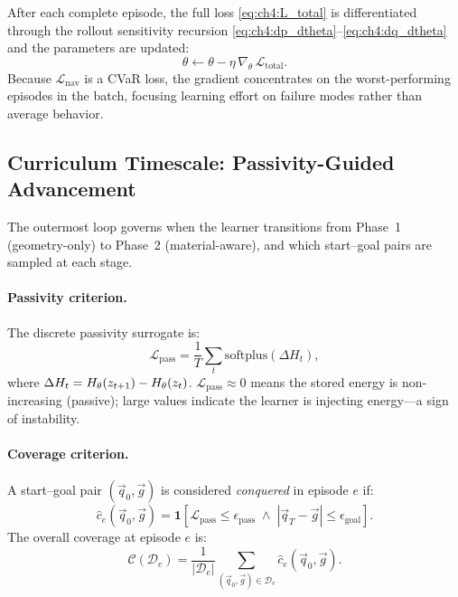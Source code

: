 After each complete episode, the full loss \eqref{eq:ch4:L_total} is
differentiated through the rollout sensitivity recursion
\eqref{eq:ch4:dp_dtheta}--\eqref{eq:ch4:dq_dtheta} and the parameters
are updated:
\begin{equation}
  \theta \leftarrow \theta - \eta\,\nabla_\theta\,\mathcal{L}_{\mathrm{total}}.
  \label{eq:ch4:episode_update}
\end{equation}
Because $\mathcal{L}_{\mathrm{nav}}$ is a CVaR loss, the gradient
concentrates on the worst-performing episodes in the batch, focusing
learning effort on failure modes rather than average behavior.

\subsection{Curriculum Timescale: Passivity-Guided Advancement}
\label{subsec:ch4:curriculum}

The outermost loop governs when the learner transitions from
Phase~1 (geometry-only) to Phase~2 (material-aware), and which
start–goal pairs are sampled at each stage.

\paragraph{Passivity criterion.}
The discrete passivity surrogate is:
\begin{equation}
  \mathcal{L}_{\mathrm{pass}}
  = \frac{1}{T}\sum_t \mathrm{softplus}(\Delta H_t),
  \label{eq:ch4:L_pass}
\end{equation}
where $\Delta H_t = H_\theta(z_{t+1}) - H_\theta(z_t)$.
$\mathcal{L}_{\mathrm{pass}} \approx 0$ means the stored energy is
non-increasing (passive); large values indicate the learner is
injecting energy—a sign of instability.

\paragraph{Coverage criterion.}
A start–goal pair $(\vec{q}_0, \vec{g})$ is considered
\emph{conquered} in episode $e$ if:
\begin{equation}
  \hat{c}_e(\vec{q}_0,\vec{g})
  = \mathbf{1}\!\left[
      \mathcal{L}_{\mathrm{pass}} \leq \epsilon_{\mathrm{pass}}
      \;\wedge\;
      |\vec{q}_T - \vec{g}| \leq \epsilon_{\mathrm{goal}}
    \right].
  \label{eq:ch4:conquest}
\end{equation}
The overall coverage at episode $e$ is:
\begin{equation}
  \mathcal{C}(\mathcal{D}_e)
  = \frac{1}{|\mathcal{D}_e|}
    \sum_{(\vec{q}_0,\vec{g})\in\mathcal{D}_e}
    \hat{c}_e(\vec{q}_0,\vec{g}).
  \label{eq:ch4:coverage}
\end{equation}

